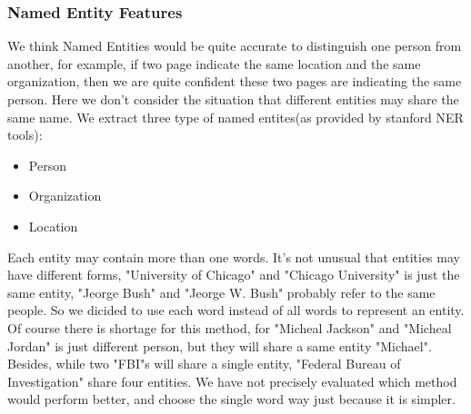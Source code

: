 \documentclass{article}
\begin{document}
\begin{CJK}{UTF8}{gbsn}
        \subsubsection{Named Entity Features}
            We think Named Entities would be quite accurate to distinguish one person from another, for example, if two page indicate the same location and the same organization, then we are quite confident these two pages are indicating the same person. Here we don't consider the situation that different entities may share the same name. We extract three type of named entites(as provided by stanford NER tools):
            \begin{itemize}
            \item Person
            \item Organization
            \item Location
            \end{itemize}
            Each entity may contain more than one words. 
            It's not unusual that entities may have different forms, "University of Chicago" and "Chicago University" is just the same entity, "Jeorge Bush" and "Jeorge W. Bush" probably refer to the same people. 
            So we dicided to use each word instead of all words to represent an entity. \\
            Of course there is shortage for this method, for "Micheal Jackson" and "Micheal Jordan" is just different person, but they will share a same entity "Michael". Besides, while two "FBI"s will share a single entity, "Federal Bureau of Investigation" share four entities. 
            We have not precisely evaluated which method would perform better, and choose the single word way just because it is simpler.


\end{CJK}
\end{document}
